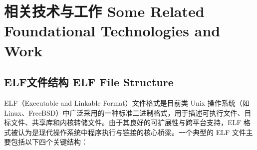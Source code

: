 %
%
%
%
%

\chapter{相关技术与工作 Some Related Foundational Technologies and Work}
\section{ELF文件结构 ELF File Structure}
ELF（Executable and Linkable Format）文件格式是目前类 Unix 操作系统（如 Linux、FreeBSD）中广泛采用的一种标准二进制格式，用于描述可执行文件、目标文件、共享库和内核转储文件。由于其良好的可扩展性与跨平台支持，ELF 格式被认为是现代操作系统中程序执行与链接的核心桥梁。一个典型的 ELF 文件主要包括以下四个关键结构：

